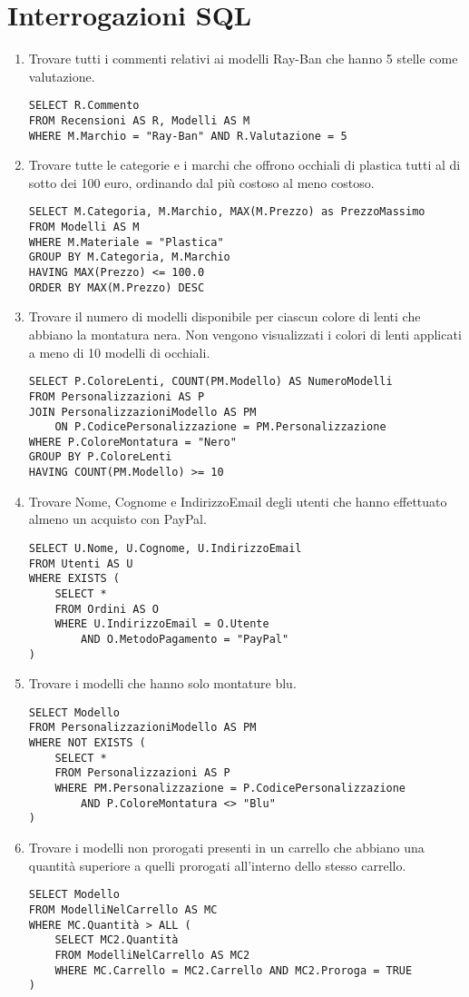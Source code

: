 \section{Interrogazioni SQL}

\begin{enumerate}[label=\Alph*.]
	\item Trovare tutti i commenti relativi ai modelli Ray-Ban che hanno 5 stelle come valutazione.
	      \begin{verbatim}
SELECT R.Commento
FROM Recensioni AS R, Modelli AS M
WHERE M.Marchio = "Ray-Ban" AND R.Valutazione = 5
	\end{verbatim}
	\item Trovare tutte le categorie e i marchi che offrono occhiali di plastica tutti al di sotto
	      dei 100 euro, ordinando dal più costoso al meno costoso.
	      \begin{verbatim}
SELECT M.Categoria, M.Marchio, MAX(M.Prezzo) as PrezzoMassimo
FROM Modelli AS M
WHERE M.Materiale = "Plastica"
GROUP BY M.Categoria, M.Marchio
HAVING MAX(Prezzo) <= 100.0
ORDER BY MAX(M.Prezzo) DESC
\end{verbatim}
	\item Trovare il numero di modelli disponibile per ciascun colore di lenti che abbiano la
	      montatura nera. Non vengono visualizzati i colori di lenti applicati a meno di 10
	      modelli di occhiali.
	      \begin{verbatim}
SELECT P.ColoreLenti, COUNT(PM.Modello) AS NumeroModelli
FROM Personalizzazioni AS P
JOIN PersonalizzazioniModello AS PM 
	ON P.CodicePersonalizzazione = PM.Personalizzazione
WHERE P.ColoreMontatura = "Nero"
GROUP BY P.ColoreLenti
HAVING COUNT(PM.Modello) >= 10
		  \end{verbatim}
	\item Trovare Nome, Cognome e IndirizzoEmail degli utenti che hanno effettuato almeno un
	      acquisto con PayPal.
	      \begin{verbatim}
SELECT U.Nome, U.Cognome, U.IndirizzoEmail
FROM Utenti AS U
WHERE EXISTS (
	SELECT *
	FROM Ordini AS O
	WHERE U.IndirizzoEmail = O.Utente
		AND O.MetodoPagamento = "PayPal"
)
	\end{verbatim}
	      \newpage
	\item Trovare i modelli che hanno solo montature blu.
	      \begin{verbatim}
SELECT Modello
FROM PersonalizzazioniModello AS PM
WHERE NOT EXISTS (
	SELECT *
	FROM Personalizzazioni AS P
	WHERE PM.Personalizzazione = P.CodicePersonalizzazione 
		AND P.ColoreMontatura <> "Blu"
)
\end{verbatim}
	\item Trovare i modelli non prorogati presenti in un carrello che abbiano una quantità
	      superiore a quelli prorogati all'interno dello stesso carrello.
	      \begin{verbatim}
SELECT Modello
FROM ModelliNelCarrello AS MC
WHERE MC.Quantità > ALL (
    SELECT MC2.Quantità
    FROM ModelliNelCarrello AS MC2
	WHERE MC.Carrello = MC2.Carrello AND MC2.Proroga = TRUE
)
	\end{verbatim}
\end{enumerate}
